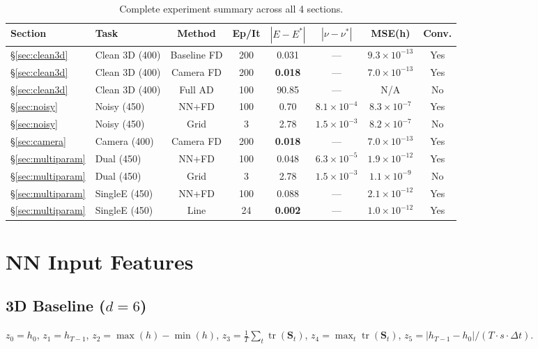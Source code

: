 \documentclass{article}
\begin{document}
\begin{table}[H]
\centering
\caption{Complete experiment summary across all 4 sections.}
\label{tab:full_results}
{\small
\begin{tabular}{llcccccc}
\toprule
Section & Task & Method & Ep/It & $|E-E^*|$ & $|\nu-\nu^*|$ & MSE(h) & Conv. \\
\midrule
\S\ref{sec:clean3d} & Clean 3D (400) & Baseline FD & 200 & 0.031 & --- & $9.3\times10^{-13}$ & Yes \\
\S\ref{sec:clean3d} & Clean 3D (400) & Camera FD & 200 & \textbf{0.018} & --- & $7.0\times10^{-13}$ & Yes \\
\S\ref{sec:clean3d} & Clean 3D (400) & Full AD & 100 & 90.85 & --- & N/A & No \\
\midrule
\S\ref{sec:noisy} & Noisy (450) & NN+FD & 100 & 0.70 & $8.1\times10^{-4}$ & $8.3\times10^{-7}$ & Yes \\
\S\ref{sec:noisy} & Noisy (450) & Grid & 3 & 2.78 & $1.5\times10^{-3}$ & $8.2\times10^{-7}$ & No \\
\midrule
\S\ref{sec:camera} & Camera (400) & Camera FD & 200 & \textbf{0.018} & --- & $7.0\times10^{-13}$ & Yes \\
\midrule
\S\ref{sec:multiparam} & Dual (450) & NN+FD & 100 & 0.048 & \textbf{$6.3\times10^{-5}$} & $1.9\times10^{-12}$ & Yes \\
\S\ref{sec:multiparam} & Dual (450) & Grid & 3 & 2.78 & $1.5\times10^{-3}$ & $1.1\times10^{-9}$ & No \\
\S\ref{sec:multiparam} & SingleE (450) & NN+FD & 100 & 0.088 & --- & $2.1\times10^{-12}$ & Yes \\
\S\ref{sec:multiparam} & SingleE (450) & Line & 24 & \textbf{0.002} & --- & $1.0\times10^{-12}$ & Yes \\
\bottomrule
\end{tabular}}
\end{table}

\section{NN Input Features}

\subsection*{3D Baseline ($d=6$)}
$z_0=h_0$, $z_1=h_{T-1}$, $z_2=\max(h)-\min(h)$,
$z_3=\frac{1}{T}\sum_t\operatorname{tr}(\mathbf{S}_t)$,
$z_4=\max_t\operatorname{tr}(\mathbf{S}_t)$,
$z_5=|h_{T-1}-h_0|/(T\cdot s\cdot\Delta t)$.
\end{document}
